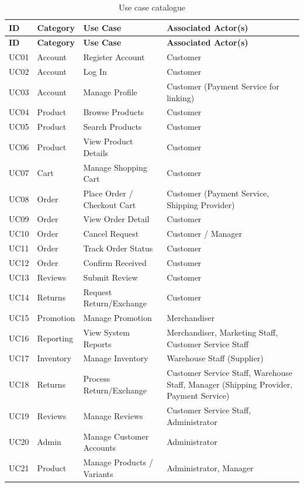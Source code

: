 \documentclass[11pt,a4paper,oneside]{extreport}
\begin{document}
{\small
\begin{xltabular}{\textwidth}{@{}l L{1.9cm} Y L{4.6cm}@{}}
\caption{Use case catalogue}\label{tab:uccat}\\
\toprule
\textbf{ID} & \textbf{Category} & \textbf{Use Case} & \textbf{Associated Actor(s)} \\ \midrule
\endfirsthead
\toprule
\textbf{ID} & \textbf{Category} & \textbf{Use Case} & \textbf{Associated Actor(s)} \\ \midrule
\endhead
\bottomrule
\endlastfoot
UC01 & Account & Register Account & Customer \\
UC02 & Account & Log In & Customer \\
UC03 & Account & Manage Profile & Customer (Payment Service for linking) \\
UC04 & Product & Browse Products & Customer \\
UC05 & Product & Search Products & Customer \\
UC06 & Product & View Product Details & Customer \\
UC07 & Cart & Manage Shopping Cart & Customer \\
UC08 & Order & Place Order / Checkout Cart & Customer (Payment Service, Shipping Provider) \\
UC09 & Order & View Order Detail & Customer \\
UC10 & Order & Cancel Request & Customer / Manager \\
UC11 & Order & Track Order Status & Customer \\
UC12 & Order & Confirm Received & Customer \\
UC13 & Reviews & Submit Review & Customer \\
UC14 & Returns & Request Return/Exchange & Customer \\
UC15 & Promotion & Manage Promotion & Merchandiser \\
UC16 & Reporting & View System Reports & Merchandiser, Marketing Staff, Customer Service Staff \\
UC17 & Inventory & Manage Inventory & Warehouse Staff (Supplier) \\
UC18 & Returns & Process Return/Exchange & Customer Service Staff, Warehouse Staff, Manager (Shipping Provider, Payment Service) \\
UC19 & Reviews & Manage Reviews & Customer Service Staff, Administrator \\
UC20 & Admin & Manage Customer Accounts & Administrator \\
UC21 & Product & Manage Products / Variants & Administrator, Manager \\

\end{xltabular}}
\end{document}
